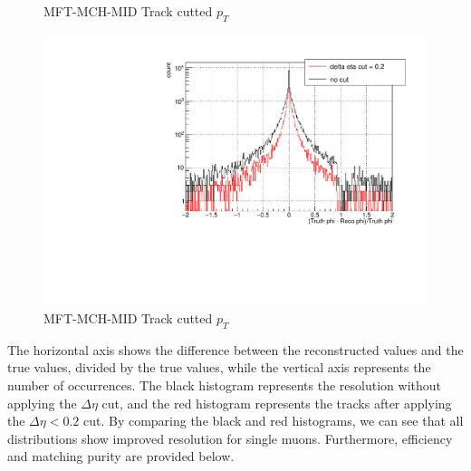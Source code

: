 \begin{figure}[htbp]
\begin{minipage}{0.3\textwidth}
                        \caption{MFT-MCH-MID Track cutted $p_T$}
                        \label{Analysis:Matching:eta resolution}
                    \end{minipage}
                    \begin{minipage}{0.3\textwidth}
                        \centering
                        \includegraphics[width=\textwidth]{fig/3_3_phi_resolution.pdf} %
                        \caption{MFT-MCH-MID Track cutted $p_T$}
                        \label{Analysis:Matching:phi resolution}
                    \end{minipage}
                \end{figure}
                The horizontal axis shows the difference between the reconstructed values and the true values, divided by the true values, while the vertical axis represents the number of occurrences. The black histogram represents the resolution without applying the $\Delta \eta$ cut, and the red histogram represents the tracks after applying the $\Delta \eta < 0.2$ cut. By comparing the black and red histograms, we can see that all distributions show improved resolution for single muons. Furthermore, efficiency and matching purity are provided below.
